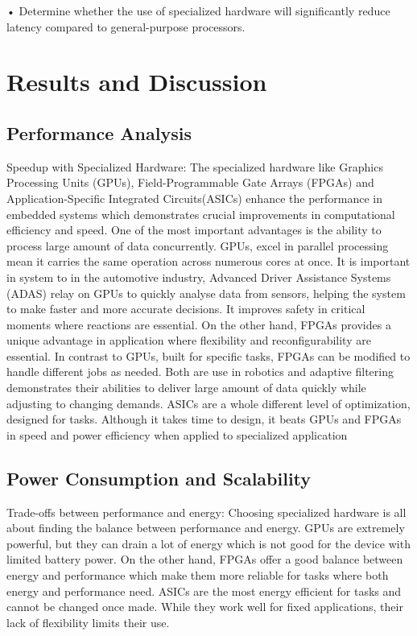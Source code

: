 \documentclass{article}
\begin{document}
• Determine whether the use of specialized hardware will significantly reduce latency compared
to general-purpose processors.


\newpage
\section{Results and Discussion}
\subsection{Performance Analysis}
Speedup with Specialized Hardware: The specialized hardware like Graphics Processing Units (GPUs), Field-Programmable Gate Arrays (FPGAs) and Application-Specific Integrated Circuits(ASICs) enhance the performance in embedded systems which demonstrates crucial improvements in computational efficiency and speed. One of the most important advantages is the ability to process large amount of data concurrently. GPUs, excel in parallel processing mean it carries the same operation across numerous cores at once. It is important in system to in the automotive industry, Advanced Driver Assistance Systems (ADAS) relay on GPUs to quickly analyse data from sensors, helping the system to make faster and more accurate decisions. It improves safety in critical moments where reactions are essential. On the other hand, FPGAs provides a unique advantage in application where flexibility and reconfigurability are essential. In contrast to GPUs, built for specific tasks, FPGAs can be modified to handle different jobs as needed. Both are use in robotics and adaptive filtering demonstrates their abilities to deliver large amount of data quickly while adjusting to changing demands. ASICs are a whole different level of optimization, designed for tasks. Although it takes time to design, it beats GPUs and FPGAs in speed and power efficiency when applied to specialized application

\subsection{Power Consumption and Scalability}
Trade-offs between performance and energy: Choosing specialized hardware is all about finding the balance between performance and energy. GPUs are extremely powerful, but they can drain a lot of energy which is not good for the device with limited battery power. On the other hand, FPGAs offer a good balance between energy and performance which make them more reliable for tasks where both energy and performance need. ASICs are the most energy efficient for tasks and cannot be changed once made. While they work well for fixed applications, their lack of flexibility limits their use.
\end{document}
